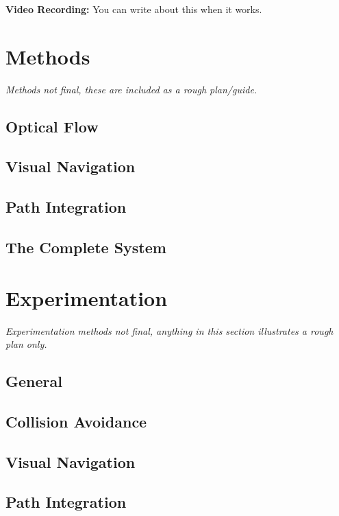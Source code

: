 \documentclass[a4paper,11pt,twoside,openright]{article}
\let\oldsection\section
\def\section{\cleardoublepage\oldsection}
\begin{document}
\textbf{Video Recording:}
You can write about this when it works.
\newpage

\section{ Methods } \label{sec:methods}
\textit{
  Methods not final, these are included as a rough plan/guide.
  }
\subsection{ Optical Flow }
\subsection{ Visual Navigation }
\subsection{ Path Integration }
\subsection{ The Complete System}

\section{Experimentation}\label{sec:test}
\textit{
  Experimentation methods not final, anything in this section illustrates a
  rough plan only.
}
\subsection{General}
\subsection{Collision Avoidance}
\subsection{Visual Navigation}
\subsection{Path Integration}
\newpage
\end{document}
